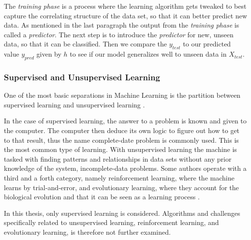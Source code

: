 	The \textit{training phase} is a process where the learning algorithm gets tweaked to best capture the correlating structure of the data set, so that it can better predict new data. As mentioned in the last paragraph the output from the \textit{training phase} is called a \textit{predictor}. The next step is to introduce the \textit{predictor} for new, unseen data, so that it can be classified. Then we compare the $y_{test}$ to our predicted value $y_{pred}$ given by $h$ to see if our model generalizes well to unseen data in $X_{test}$. 
	
	\subsubsection{Supervised and Unsupervised Learning }
	One of the most basic separations in Machine Learning is the partition between supervised learning and unsupervised learning \cite{gentle2012handbook}.
	
	In the case of supervised learning, the answer to a problem is known and given to the computer. The computer then deduce its own logic to figure out how to get to that result, thus the name complete-date problem is commonly used. This is the most common type of learning. With unsupervised learning the machine is tasked with finding patterns and relationships in data sets without any prior knowledge of the system, incomplete-data problems. Some authors operate with a third and a forth category, namely reinforcement learning, where the machine learns by trial-and-error, and evolutionary learning, where they account for the biological evolution and that it can be seen as a learning process \cite{marsland2014machine}.
		
	In this thesis, only supervised learning is considered. Algorithms and challenges specifically related to unsupervised learning, reinforcement learning, and evolutionary learning, is therefore not further examined. 

